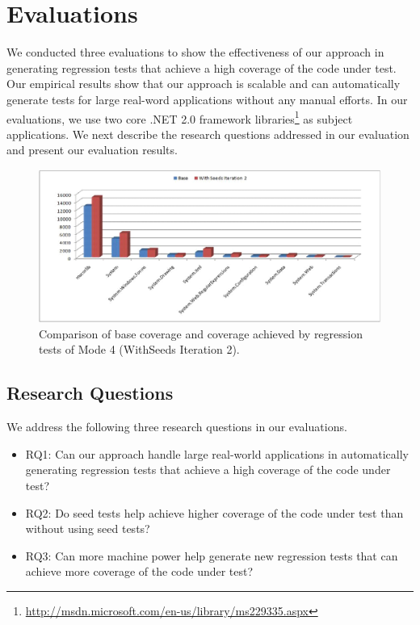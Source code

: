 \section{Evaluations}
\label{sec:eval}

We conducted three evaluations to show the effectiveness of our approach in
generating regression tests that achieve a high coverage of the code under test. 
Our empirical results show that our approach is scalable and can automatically generate
tests for large real-word applications without any manual efforts. In our evaluations, 
we use two core .NET 2.0 framework libraries\footnote{\url{http://msdn.microsoft.com/en-us/library/ms229335.aspx}} 
as subject applications. We next describe the research questions addressed in our evaluation and present our evaluation results.

\begin{figure}[t]
\centering
\includegraphics[scale=0.70,clip]{figs/RQ2_1.eps}\vspace*{-1ex}
\caption{Comparison of base coverage and coverage achieved by regression tests of Mode 4 (WithSeeds Iteration 2).} \label{fig:rq2}
\end{figure}

\subsection{Research Questions}
\label{sec:research}

We address the following three research questions in our evaluations.

\begin{itemize}
\item RQ1: Can our approach handle large real-world applications in automatically generating
regression tests that achieve a high coverage of the code under test? 
\item RQ2: Do seed tests help achieve higher coverage of the code under test than without using seed tests?
\item RQ3: Can more machine power help generate new regression tests that can achieve
more coverage of the code under test?
\end{itemize}

